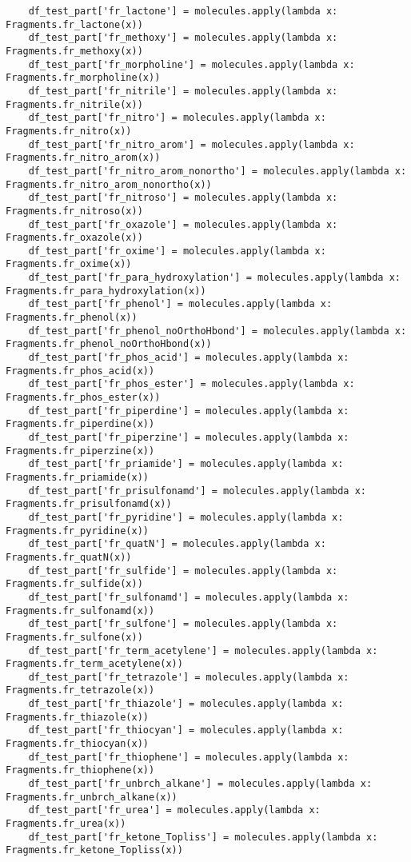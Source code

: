 \documentclass[11pt, oneside]{article}   	%
\begin{document}
\begin{lstlisting}
    df_test_part['fr_lactone'] = molecules.apply(lambda x: Fragments.fr_lactone(x))
    df_test_part['fr_methoxy'] = molecules.apply(lambda x: Fragments.fr_methoxy(x))
    df_test_part['fr_morpholine'] = molecules.apply(lambda x: Fragments.fr_morpholine(x))
    df_test_part['fr_nitrile'] = molecules.apply(lambda x: Fragments.fr_nitrile(x))
    df_test_part['fr_nitro'] = molecules.apply(lambda x: Fragments.fr_nitro(x))
    df_test_part['fr_nitro_arom'] = molecules.apply(lambda x: Fragments.fr_nitro_arom(x))
    df_test_part['fr_nitro_arom_nonortho'] = molecules.apply(lambda x: Fragments.fr_nitro_arom_nonortho(x))
    df_test_part['fr_nitroso'] = molecules.apply(lambda x: Fragments.fr_nitroso(x))
    df_test_part['fr_oxazole'] = molecules.apply(lambda x: Fragments.fr_oxazole(x))
    df_test_part['fr_oxime'] = molecules.apply(lambda x: Fragments.fr_oxime(x))
    df_test_part['fr_para_hydroxylation'] = molecules.apply(lambda x: Fragments.fr_para_hydroxylation(x))
    df_test_part['fr_phenol'] = molecules.apply(lambda x: Fragments.fr_phenol(x))
    df_test_part['fr_phenol_noOrthoHbond'] = molecules.apply(lambda x: Fragments.fr_phenol_noOrthoHbond(x))
    df_test_part['fr_phos_acid'] = molecules.apply(lambda x: Fragments.fr_phos_acid(x))
    df_test_part['fr_phos_ester'] = molecules.apply(lambda x: Fragments.fr_phos_ester(x))
    df_test_part['fr_piperdine'] = molecules.apply(lambda x: Fragments.fr_piperdine(x))
    df_test_part['fr_piperzine'] = molecules.apply(lambda x: Fragments.fr_piperzine(x))
    df_test_part['fr_priamide'] = molecules.apply(lambda x: Fragments.fr_priamide(x))
    df_test_part['fr_prisulfonamd'] = molecules.apply(lambda x: Fragments.fr_prisulfonamd(x))
    df_test_part['fr_pyridine'] = molecules.apply(lambda x: Fragments.fr_pyridine(x))
    df_test_part['fr_quatN'] = molecules.apply(lambda x: Fragments.fr_quatN(x))
    df_test_part['fr_sulfide'] = molecules.apply(lambda x: Fragments.fr_sulfide(x))
    df_test_part['fr_sulfonamd'] = molecules.apply(lambda x: Fragments.fr_sulfonamd(x))
    df_test_part['fr_sulfone'] = molecules.apply(lambda x: Fragments.fr_sulfone(x))
    df_test_part['fr_term_acetylene'] = molecules.apply(lambda x: Fragments.fr_term_acetylene(x))
    df_test_part['fr_tetrazole'] = molecules.apply(lambda x: Fragments.fr_tetrazole(x))
    df_test_part['fr_thiazole'] = molecules.apply(lambda x: Fragments.fr_thiazole(x))
    df_test_part['fr_thiocyan'] = molecules.apply(lambda x: Fragments.fr_thiocyan(x))
    df_test_part['fr_thiophene'] = molecules.apply(lambda x: Fragments.fr_thiophene(x))
    df_test_part['fr_unbrch_alkane'] = molecules.apply(lambda x: Fragments.fr_unbrch_alkane(x))
    df_test_part['fr_urea'] = molecules.apply(lambda x: Fragments.fr_urea(x))
    df_test_part['fr_ketone_Topliss'] = molecules.apply(lambda x: Fragments.fr_ketone_Topliss(x))
    

\end{lstlisting}
\end{document}

